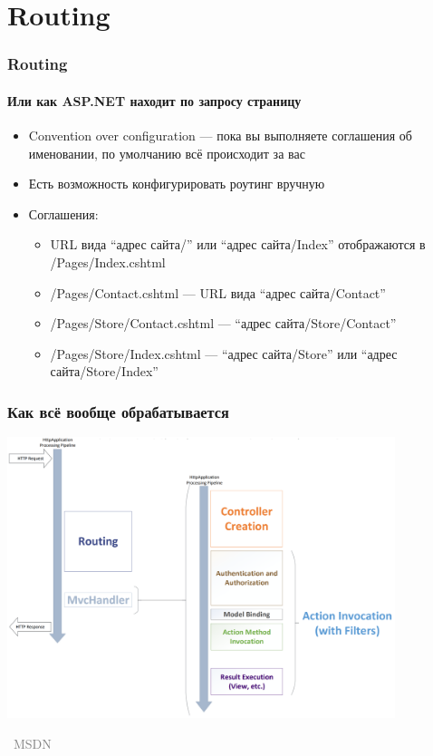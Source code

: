 \documentclass[xetex,mathserif,serif]{beamer}
\newcommand{\attribution}[1] {
\vspace{-5mm}\begin{flushright}\begin{scriptsize}\textcolor{gray}{\textcopyright\, #1}\end{scriptsize}\end{flushright}
}
\begin{document}
	\section{Routing}

	\begin{frame}
		\frametitle{Routing}
		\framesubtitle{Или как ASP.NET находит по запросу страницу}
		\begin{itemize}
			\item Convention over configuration --- пока вы выполняете соглашения об именовании, по умолчанию всё происходит за вас
			\item Есть возможность конфигурировать роутинг вручную
			\item Соглашения:
			\begin{itemize}
				\item URL вида ``адрес сайта/'' или ``адрес сайта/Index'' отображаются в /Pages/Index.cshtml
				\item /Pages/Contact.cshtml --- URL вида ``адрес сайта/Contact''
				\item /Pages/Store/Contact.cshtml --- ``адрес сайта/Store/Contact''
				\item /Pages/Store/Index.cshtml --- ``адрес сайта/Store'' или ``адрес сайта/Store/Index''
			\end{itemize}
		\end{itemize}
	\end{frame}

	\begin{frame}
		\frametitle{Как всё вообще обрабатывается}
		\begin{center}
			\includegraphics[width=0.85\textwidth]{requestLifecycle.png}
			\vspace{-5mm}
			\attribution{MSDN}
		\end{center}
	\end{frame}
\end{document}

